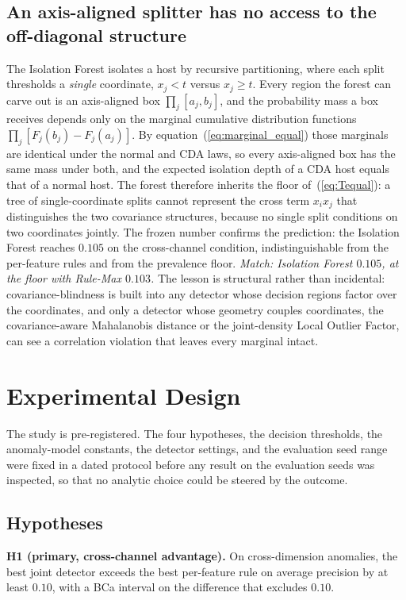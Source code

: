 \documentclass[journal]{IEEEtran}
\begin{document}
\subsection{An axis-aligned splitter has no access to the off-diagonal structure}
The Isolation Forest isolates a host by recursive partitioning, where each split thresholds a
\emph{single} coordinate, $x_j < t$ versus $x_j \geq t$. Every region the forest can carve out is an
axis-aligned box $\prod_j [a_j, b_j]$, and the probability mass a box receives depends only on the
marginal cumulative distribution functions $\prod_j [F_j(b_j) - F_j(a_j)]$. By
equation~(\ref{eq:marginal_equal}) those marginals are identical under the normal and CDA laws, so
every axis-aligned box has the same mass under both, and the expected isolation depth of a CDA host
equals that of a normal host. The forest therefore inherits the floor of~(\ref{eq:Tequal}): a tree of
single-coordinate splits cannot represent the cross term $x_i x_j$ that distinguishes the two
covariance structures, because no single split conditions on two coordinates jointly. The frozen
number confirms the prediction: the Isolation Forest reaches $0.105$ on the cross-channel condition,
indistinguishable from the per-feature rules and from the prevalence floor. \emph{Match: Isolation
Forest $0.105$, at the floor with Rule-Max $0.103$.} The lesson is structural rather than incidental:
covariance-blindness is built into any detector whose decision regions factor over the coordinates,
and only a detector whose geometry couples coordinates, the covariance-aware Mahalanobis distance or
the joint-density Local Outlier Factor, can see a correlation violation that leaves every marginal
intact.

\section{Experimental Design}
The study is pre-registered. The four hypotheses, the decision thresholds, the anomaly-model
constants, the detector settings, and the evaluation seed range were fixed in a dated protocol
before any result on the evaluation seeds was inspected, so that no analytic choice could be steered
by the outcome.

\subsection{Hypotheses}
\textbf{H1 (primary, cross-channel advantage).} On cross-dimension anomalies, the best joint
detector exceeds the best per-feature rule on average precision by at least $0.10$, with a BCa
interval on the difference that excludes $0.10$.
\end{document}
